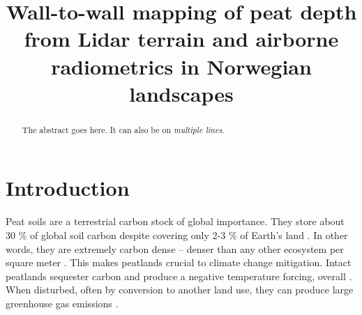 \documentclass[soil, manuscript]{copernicus}
\begin{document}
\title{Wall-to-wall mapping of peat depth from Lidar terrain and airborne radiometrics in Norwegian landscapes}











\received{}
\pubdiscuss{} %
\revised{}
\accepted{}
\published{}




\maketitle


\begin{abstract}
The abstract goes here.
It can also be on \emph{multiple lines}.
\end{abstract}




\section{Introduction}

Peat soils are a terrestrial carbon stock of global importance.
They store about 30 \% of global soil carbon despite covering only 2-3 \% of Earth's land \citep{xuPEATMAPRefiningEstimates2018, friedlingsteinGlobalCarbonBudget2020, unepGlobalPeatlandsAssessment2022}.
In other words, they are extremely carbon dense -- denser than any other ecosystem per square meter \citep{temminkRecoveringWetlandBiogeomorphic2022}.
This makes peatlands crucial to climate change mitigation.
Intact peatlands sequester carbon and produce a negative temperature forcing, overall \citep{joostenRolePeatlandsClimate2016}.
When disturbed, often by conversion to another land use, they can produce large greenhouse gas emissions \citep{maGloballyRobustRelationship2022}.
\end{document}
